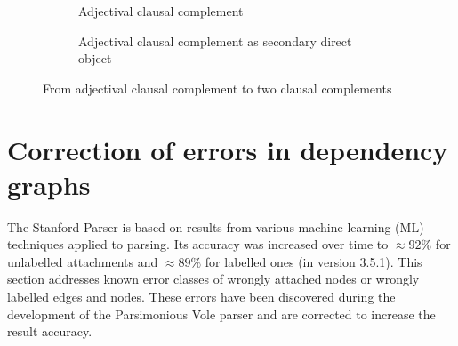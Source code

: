     \begin{figure}[!ht]
    	\begin{subfigure}{0.45\linewidth}
    		\centering
    		\caption{Adjectival clausal complement}
    		\label{fig:xcomp-jj-init}
    	\end{subfigure}
    	\quad
    	\begin{subfigure}{0.45\linewidth}
    		\centering
    		\caption{Adjectival clausal complement as secondary direct object}
    		\label{fig:xcomp-jj-final}
    	\end{subfigure}
    	\caption{From adjectival clausal complement to two clausal complements}
		\label{fig:xcomp-jj-final-final}
    \end{figure}

\section{Correction of errors in dependency graphs}
\label{sec:preprocessing2}

    The Stanford Parser is based on results from various machine learning (ML) techniques applied to parsing. Its accuracy was increased over time to $\approx92\%$ for unlabelled attachments and $\approx89\%$ for labelled ones (in version 3.5.1). This section addresses known error classes of wrongly attached nodes or wrongly labelled edges and nodes. These errors have been discovered during the development of the Parsimonious Vole parser and are corrected to increase the result accuracy. 

